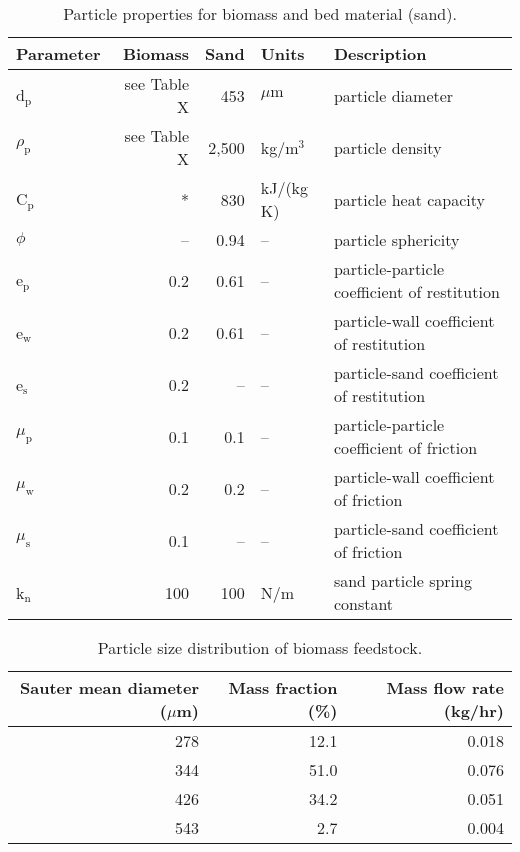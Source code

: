 \begin{table}[H]
    \centering
    \caption{Particle properties for biomass and bed material (sand).}
    \begin{tabular}{lrrll}
        \toprule
        Parameter & Biomass & Sand & Units & Description \\
        \midrule
        d$_\text{p}$    & see Table X & 453   & $\mu\text{m}$ & particle diameter \\
        $\rho_\text{p}$ & see Table X & 2,500 & kg/m$^3$      & particle density \\
        C$_\text{p}$    & *           & 830   & kJ/(kg K)     & particle heat capacity \\
        $\phi$          & --          & 0.94  & --            & particle sphericity \\
        e$_\text{p}$    & 0.2         & 0.61  & --            & particle-particle coefficient of restitution \\
        e$_\text{w}$    & 0.2         & 0.61  & --            & particle-wall coefficient of restitution \\
        e$_\text{s}$    & 0.2         & --    & --            & particle-sand coefficient of restitution \\
        $\mu_\text{p}$  & 0.1         & 0.1   & --            & particle-particle coefficient of friction \\
        $\mu_\text{w}$  & 0.2         & 0.2   & --            & particle-wall coefficient of friction \\
        $\mu_\text{s}$  & 0.1         & --    & --            & particle-sand coefficient of friction \\
        k$_\text{n}$    & 100         & 100   & N/m           & sand particle spring constant \\
        \bottomrule
    \end{tabular}
\end{table}

\begin{table}[H]
    \centering
    \caption{Particle size distribution of biomass feedstock.}
    \begin{tabular}{rrr}
        \toprule
        Sauter mean diameter ($\mu$m) & Mass fraction (\%) & Mass flow rate (kg/hr) \\
        \midrule
        278 & 12.1 & 0.018 \\
        344 & 51.0 & 0.076 \\
        426 & 34.2 & 0.051 \\
        543 & 2.7  & 0.004 \\
        \bottomrule
    \end{tabular}
\end{table}

